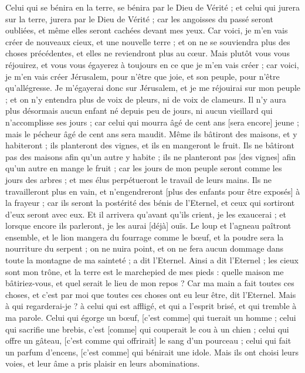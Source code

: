 \begin{multicols}{2}
Celui qui se bénira en la terre, se bénira par le Dieu de Vérité ; et celui qui jurera sur la terre, jurera par le Dieu de Vérité ; car les angoisses du passé seront oubliées, et même elles seront cachées devant mes yeux.
Car voici, je m'en vais créer de nouveaux cieux, et une nouvelle terre ; et on ne se souviendra plus des choses précédentes, et elles ne reviendront plus au cœur.
Mais plutôt vous vous réjouirez, et vous vous égayerez à toujours en ce que je m'en vais créer ; car voici, je m'en vais créer Jérusalem, pour n'être que joie, et son peuple, pour n'être qu'allégresse.
Je m'égayerai donc sur Jérusalem, et je me réjouirai sur mon peuple ; et on n'y entendra plus de voix de pleurs, ni de voix de clameurs.
Il n'y aura plus désormais aucun enfant né depuis peu de jours, ni aucun vieillard qui n'accomplisse ses jours ; car celui qui mourra âgé de cent ans [sera encore] jeune ; mais le pécheur âgé de cent ans sera maudit.
Même ils bâtiront des maisons, et y habiteront ; ils planteront des vignes, et ils en mangeront le fruit.
Ils ne bâtiront pas des maisons afin qu'un autre y habite ; ils ne planteront pas [des vignes] afin qu'un autre en mange le fruit ; car les jours de mon peuple seront comme les jours des arbres ; et mes élus perpétueront le travail de leurs mains.
Ils ne travailleront plus en vain, et n'engendreront [plus des enfants pour être exposés] à la frayeur ; car ils seront la postérité des bénis de l'Eternel, et ceux qui sortiront d'eux seront avec eux.
Et il arrivera qu'avant qu'ils crient, je les exaucerai ; et lorsque encore ils parleront, je les aurai [déjà] ouïs.
Le loup et l'agneau paîtront ensemble, et le lion mangera du fourrage comme le bœuf, et la poudre sera la nourriture du serpent ; on ne nuira point, et on ne fera aucun dommage dans toute la montagne de ma sainteté ; a dit l'Eternel.
\VerseOne{}Ainsi a dit l'Eternel ; les cieux sont mon trône, et la terre est le marchepied de mes pieds : quelle maison me bâtiriez-vous, et quel serait le lieu de mon repos ?
Car ma main a fait toutes ces choses, et c'est par moi que toutes ces choses ont eu leur être, dit l'Eternel. Mais à qui regarderai-je ? à celui qui est affligé, et qui a l'esprit brisé, et qui tremble à ma parole.
Celui qui égorge un bœuf, [c'est comme] qui tuerait un homme ; celui qui sacrifie une brebis, c'est [comme] qui couperait le cou à un chien ; celui qui offre un gâteau, [c'est comme qui offrirait] le sang d'un pourceau ; celui qui fait un parfum d'encens, [c'est comme] qui bénirait une idole. Mais ils ont choisi leurs voies, et leur âme a pris plaisir en leurs abominations.

\end{multicols}
